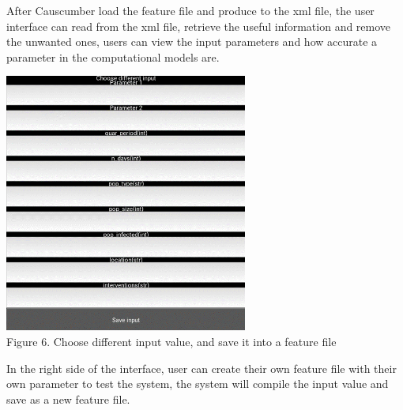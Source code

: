 After Causcumber load the feature file and produce to the xml file, the user interface can read from the xml file, retrieve the useful information and remove the unwanted ones, users can view the input parameters and how accurate a parameter in the computational models are.
\begin{center}
	\includegraphics[width=8cm]{figures/Input_section.png}\\
	Figure 6. Choose different input value, and save it into a feature file
\end{center}
In the right side of the interface, user can create their own feature file with their own parameter to test the system, the system will compile the input value and save as a new feature file.
